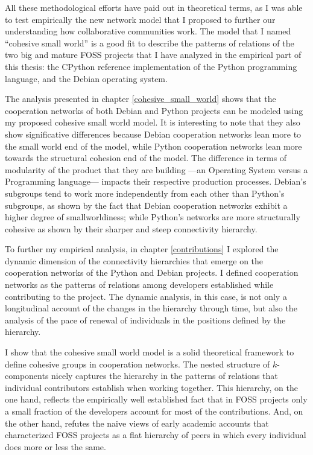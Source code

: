 All these methodological efforts have paid out in theoretical terms, as I was able to test empirically the new network model that I proposed to further our understanding how collaborative communities work. The model that I named ``cohesive small world'' is a good fit to describe the patterns of relations of the two big and mature FOSS projects that I have analyzed in the empirical part of this thesis: the CPython reference implementation of the Python programming language, and the Debian operating system.

The analysis presented in chapter \ref{cohesive_small_world} shows that the cooperation networks of both Debian and Python projects can be modeled using my proposed cohesive small world model. It is interesting to note that they also show significative differences because Debian cooperation networks lean more to the small world end of the model, while Python cooperation networks lean more towards the structural cohesion end of the model. The difference in terms of modularity of the product that they are building ---an Operating System versus a Programming language--- impacts their respective production processes. Debian's subgroups tend to work more independently from each other than Python's subgroups, as shown by the fact that Debian cooperation networks exhibit a higher degree of smallworldiness; while Python's networks are more structurally cohesive as shown by their sharper and steep connectivity hierarchy.

To further my empirical analysis, in chapter \ref{contributions} I explored the dynamic dimension of the connectivity hierarchies that emerge on the cooperation networks of the Python and Debian projects. I defined cooperation networks as the patterns of relations among developers established while contributing to the project. The dynamic analysis, in this case, is not only a longitudinal account of the changes in the hierarchy through time, but also the analysis of the pace of renewal of individuals in the positions defined by the hierarchy.

I show that the cohesive small world model is a solid theoretical framework to define cohesive groups in cooperation networks. The nested structure of $k$-components nicely captures the hierarchy in the patterns of relations that individual contributors establish when working together. This hierarchy, on the one hand, reflects the empirically well established fact that in FOSS projects only a small fraction of the developers account for most of the contributions. And, on the other hand, refutes the naive views of early academic accounts that characterized FOSS projects as a flat hierarchy of peers in which every individual does more or less the same. 

